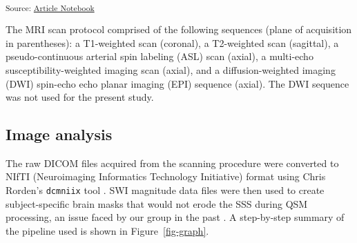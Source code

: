 \documentclass[
true
]{sn-jnl}
\begin{document}
\textsubscript{Source:
\href{https://WeberLab.github.io/Chisep_CSVO2_Manuscript/index-preview.html}{Article
Notebook}}

The MRI scan protocol comprised of the following sequences (plane of
acquisition in parentheses): a T1-weighted scan (coronal), a T2-weighted
scan (sagittal), a pseudo-continuous arterial spin labeling (ASL) scan
\citep{alsopRecommendedImplementationArterial2015} (axial), a multi-echo
susceptibility-weighted imaging scan
\citep{denkSusceptibilityWeightedImaging2010} (axial), and a
diffusion-weighted imaging (DWI) spin-echo echo planar imaging (EPI)
sequence (axial). The DWI sequence was not used for the present study.

\subsection{Image analysis}\label{image-analysis}

The raw DICOM files acquired from the scanning procedure were converted
to NIfTI (Neuroimaging Informatics Technology Initiative) format using
Chris Rorden's \texttt{dcmniix} tool
\citep{liFirstStepNeuroimaging2016}. SWI magnitude data files were then
used to create subject-specific brain masks that would not erode the SSS
during QSM processing, an issue faced by our group in the past
\citep{weberQuantitativeSusceptibilityMapping2021}. A step-by-step
summary of the pipeline used is shown in Figure~\ref{fig-graph}.
\end{document}
